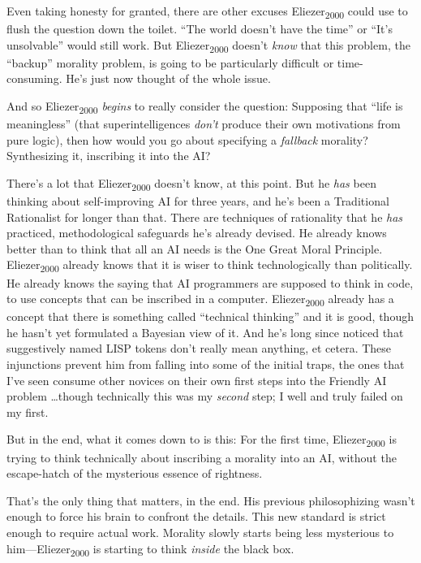 {
 Even taking honesty for granted, there are other excuses
Eliezer\textsubscript{2000} could use to flush the question down the
toilet. ``The world doesn't have the
time'' or ``It's
unsolvable'' would still work. But
Eliezer\textsubscript{2000} doesn't \textit{know} that
this problem, the ``backup''
morality problem, is going to be particularly difficult or
time-consuming. He's just now thought of the whole
issue.}

{
 And so Eliezer\textsubscript{2000} \textit{begins} to really
consider the question: Supposing that ``life is
meaningless'' (that superintelligences
\textit{don't} produce their own motivations from pure
logic), then how would you go about specifying a \textit{fallback}
morality? Synthesizing it, inscribing it into the AI?}

{
 There's a lot that Eliezer\textsubscript{2000}
doesn't know, at this point. But he \textit{has} been
thinking about self-improving AI for three years, and
he's been a Traditional Rationalist for longer than
that. There are techniques of rationality that he \textit{has}
practiced, methodological safeguards he's already
devised. He already knows better than to think that all an AI needs is
the One Great Moral Principle. Eliezer\textsubscript{2000} already
knows that it is wiser to think technologically than politically. He
already knows the saying that AI programmers are supposed to think in
code, to use concepts that can be inscribed in a computer.
Eliezer\textsubscript{2000} already has a concept that there is
something called ``technical
thinking'' and it is good, though he
hasn't yet formulated a Bayesian view of it. And
he's long since noticed that suggestively named LISP
tokens don't really mean anything, et cetera. These
injunctions prevent him from falling into some of the initial traps,
the ones that I've seen consume other novices on their
own first steps into the Friendly AI problem \ldots though technically
this was my \textit{second} step; I well and truly failed on my first.}

{
 But in the end, what it comes down to is this: For the first time,
Eliezer\textsubscript{2000} is trying to think technically about
inscribing a morality into an AI, without the escape-hatch of the
mysterious essence of rightness.}

{
 That's the only thing that matters, in the end.
His previous philosophizing wasn't enough to force his
brain to confront the details. This new standard is strict enough to
require actual work. Morality slowly starts being less mysterious to
him---Eliezer\textsubscript{2000} is starting to think \textit{inside}
the black box.}

